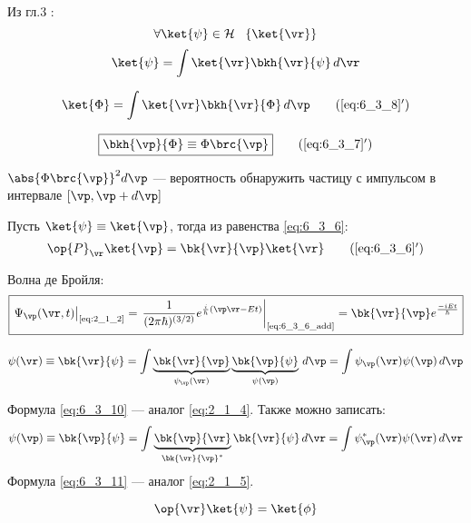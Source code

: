 Из гл.3 :
$$
\forall \ket{\psi} \in \mathcal{H} ~~ \left\{ \ket{\vr} \right\}
$$
\begin{equation}
\label{eq:6_3_8}
\ket{\psi}=\int \ket{\vr}\bkh{\vr}{\psi} \, d\vr
\end{equation}

\begin{equation}
\label{eq:6_3_8_add}
\ket{\Phi}=\int \ket{\vr}\bkh{\vr}{\Phi} \, d\vp
\tag{\ref{eq:6_3_8}$'$}
\end{equation}

\begin{equation}
\label{eq:6_3_7_add}
\boxed{\bkh{\vp}{\Phi} \equiv \Phi\brc{\vp}}
\tag{\ref{eq:6_3_7}$'$}
\end{equation}

$\abs{\Phi\brc{\vp}}^2 d\vp$ --- вероятность обнаружить частицу с импульсом в интервале $[\vp, \vp+d\vp]$

Пусть $\ket{\psi}\equiv\ket{\vp}$, тогда из равенства \eqref{eq:6_3_6}:
\begin{equation}
\label{eq:6_3_6_add}
\op{P}_{\vr}\ket{\vp}=\bk{\vr}{\vp}\ket{\vr}
\tag{\ref{eq:6_3_6}$'$}
\end{equation}

Волна де Бройля:
\begin{equation}
\label{eq:6_3_9}
\boxed{
	\left. \Psi_{\vp}(\vr,t) \right|_{\text{\eqref{eq:2_1_2}}} = 
	\left. \frac{1}{(2\pi \hbar)^{(3/2)}} e^{\frac{i}{h} (\vp\vr-Et)}  \right|_{\text{\eqref{eq:6_3_6_add}}} = 
	\bk{\vr}{\vp} e^\frac{-iEt}{\hbar}
}
\end{equation}

\begin{equation}
\label{eq:6_3_10}
\psi(\vr) \equiv \bk{\vr}{\psi} = 
\int \underbrace{  \bk{\vr}{\vp}  }_ {\psi_{\vp}(\vr)}  \underbrace{ \bk{\vp}{\psi} }_{\psi(\vp)} \, d\vp =
\int \psi_{\vp}(\vr) \psi(\vp) \, d\vp
\end{equation}

Формула \eqref{eq:6_3_10} --- аналог \eqref{eq:2_1_4}. Также можно записать:
\begin{equation}
\label{eq:6_3_11}
\psi(\vp) \equiv \bk{\vp}{\psi} = 
\int \underbrace{  \bk{\vp}{\vr}  }_ {\bk{\vr}{\vp}^*} \bk{\vr}{\psi} \, d\vr =
\int \psi^*_{\vp}(\vr) \psi(\vr) \, d\vr
\end{equation}
Формула \eqref{eq:6_3_11} --- аналог \eqref{eq:2_1_5}. 

\begin{equation}
\label{eq:6_3_12}
\op{\vr} \ket{\psi} = \ket{\phi}
\end{equation}

